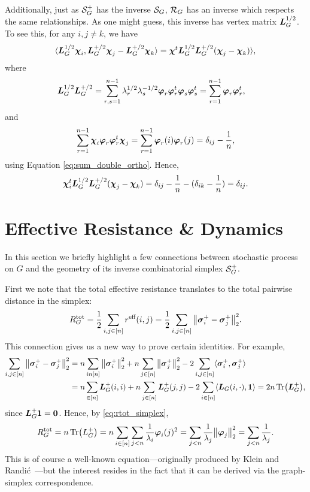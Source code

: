 Additionally, just as $\mathcal{S}_G^+$  has  the inverse $\mathcal{S}_G$, $\mathcal{R}_G$  has an inverse which respects the same  relationships. As one might guess, this inverse has vertex matrix $\vb*{L}_G^{1/2}$. To see this, for any $i,j\neq k$,  we have 
\begin{equation*}
\langle \vb*{L}_G^{1/2}\boldsymbol{\chi}_i,\vb*{L}_G^{+/2}\boldsymbol{\chi}_j-\vb*{L}_G^{+/2}\boldsymbol{\chi}_k\rangle = \boldsymbol{\chi}^t \vb*{L}_G^{1/2}\vb*{L}_G^{+/2}(\boldsymbol{\chi}_j-\boldsymbol{\chi}_k)\rangle,
\end{equation*}
where 
\begin{align*}
\vb*{L}_G^{1/2}\vb*{L}_G^{+/2} &= \sum_{r,s=1}^{n-1}\lambda_r^{1/2}\lambda_s^{-1/2}\vb*{\varphi}_r\vb*{\varphi}_r^t\vb*{\varphi}_s\vb*{\varphi}_s^t = \sum_{r=1}^{n-1} \vb*{\varphi}_r\vb*{\varphi}_r^t,
\end{align*}
and 
\begin{align*}
\sum_{r=1}^{n-1}\boldsymbol{\chi}_i \vb*{\varphi}_r\vb*{\varphi}_r^t\boldsymbol{\chi}_j = \sum_{r=1}^{n-1}\vb*{\varphi}_r(i)\vb*{\varphi}_r(j) = \delta_{ij} - \frac{1}{n},
\end{align*}
using Equation \eqref{eq:sum_double_ortho}. Hence, 
\begin{align*}
\boldsymbol{\chi}_i^t \vb*{L}_G^{1/2}\vb*{L}_G^{+/2}(\boldsymbol{\chi}_j-\boldsymbol{\chi}_k) = \delta_{ij} - \frac{1}{n} - (\delta_{ik}-\frac{1}{n}) = \delta_{ij}.
\end{align*}




\section{Effective  Resistance  \&  Dynamics}
\label{sec:dynamics}
In this section we briefly highlight a few connections between stochastic process on $G$ and  the geometry of its inverse combinatorial simplex $\mathcal{S}_G^+$. 

First  we  note that the total effective resistance translates to the total pairwise distance in the simplex: 
\begin{align}
R^{\textnormal{tot}}_G = \frac{1}{2}\sum_{i,j\in[n]} r^{\textnormal{eff}}(i,j) = \frac{1}{2}\sum_{i,j\in[n]}\norm{\vb*{\sigma}_i^+-\vb*{\sigma}_j^+}_2^2. \label{eq:rtot_simplex}
\end{align}
This connection gives us a new way to prove certain identities. For example, 
\begin{align*}
\sum_{i,j\in[n]}\norm{\vb*{\sigma}_i^+-\vb*{\sigma}_j^+}_2^2 &= n\sum_{in[n]}\norm{\vb*{\sigma}_i^+}_2^2 + n\sum_{j\in[n]}\norm{\vb*{\sigma}_j^+}_2^2 - 2\sum_{i,j\in[n]}\langle\vb*{\sigma}_i^+,\vb*{\sigma}_j^+\rangle \\ 
&= n\sum_{\in[n]}\vb*{L}_G^+(i,i) + n\sum_{j\in[n]}\vb*{L}_G^+(j,j) - 2\sum_{i\in[n]}\langle \vb*{L}_G(i,\cdot),\vb{1}\rangle = 2n\Tr(\vb*{L}_G^+),
\end{align*}
since $\vb*{L}_G^+\vb{1}=\vb{0}$. 
Hence, by \eqref{eq:rtot_simplex},
\begin{equation*}
R^{\textnormal{tot}}_G=n\Tr(L_G^+) = n\sum_{i\in[n]}\sum_{j<n} \frac{1}{\lambda_i}\vb*{\varphi}_i(j)^2 =\sum_{j<n}\frac{1}{\lambda_j}\norm{\vb*{\varphi}_j}_2^2 = \sum_{j<n}\frac{1}{\lambda_j}.
\end{equation*}
This is of course a well-known equation---originally produced by Klein  and Randi\'{c}~\cite{klein1993resistance}---but the interest resides in the fact that it can be derived via the graph-simplex correspondence.  

